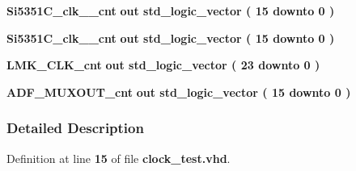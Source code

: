 \begin{DoxyCompactItemize}
\item 
{\bf Si5351\+C\+\_\+clk\+\_\+\_\+cnt}  {\bfseries {\bfseries \textcolor{keywordflow}{out}\textcolor{vhdlchar}{ }}} {\bfseries \textcolor{comment}{std\+\_\+logic\+\_\+vector}\textcolor{vhdlchar}{ }\textcolor{vhdlchar}{(}\textcolor{vhdlchar}{ }\textcolor{vhdlchar}{ } \textcolor{vhdldigit}{15} \textcolor{vhdlchar}{ }\textcolor{keywordflow}{downto}\textcolor{vhdlchar}{ }\textcolor{vhdlchar}{ } \textcolor{vhdldigit}{0} \textcolor{vhdlchar}{ }\textcolor{vhdlchar}{)}\textcolor{vhdlchar}{ }} 
\item 
{\bf Si5351\+C\+\_\+clk\+\_\+\_\+cnt}  {\bfseries {\bfseries \textcolor{keywordflow}{out}\textcolor{vhdlchar}{ }}} {\bfseries \textcolor{comment}{std\+\_\+logic\+\_\+vector}\textcolor{vhdlchar}{ }\textcolor{vhdlchar}{(}\textcolor{vhdlchar}{ }\textcolor{vhdlchar}{ } \textcolor{vhdldigit}{15} \textcolor{vhdlchar}{ }\textcolor{keywordflow}{downto}\textcolor{vhdlchar}{ }\textcolor{vhdlchar}{ } \textcolor{vhdldigit}{0} \textcolor{vhdlchar}{ }\textcolor{vhdlchar}{)}\textcolor{vhdlchar}{ }} 
\item 
{\bf L\+M\+K\+\_\+\+C\+L\+K\+\_\+cnt}  {\bfseries {\bfseries \textcolor{keywordflow}{out}\textcolor{vhdlchar}{ }}} {\bfseries \textcolor{comment}{std\+\_\+logic\+\_\+vector}\textcolor{vhdlchar}{ }\textcolor{vhdlchar}{(}\textcolor{vhdlchar}{ }\textcolor{vhdlchar}{ } \textcolor{vhdldigit}{23} \textcolor{vhdlchar}{ }\textcolor{keywordflow}{downto}\textcolor{vhdlchar}{ }\textcolor{vhdlchar}{ } \textcolor{vhdldigit}{0} \textcolor{vhdlchar}{ }\textcolor{vhdlchar}{)}\textcolor{vhdlchar}{ }} 
\item 
{\bf A\+D\+F\+\_\+\+M\+U\+X\+O\+U\+T\+\_\+cnt}  {\bfseries {\bfseries \textcolor{keywordflow}{out}\textcolor{vhdlchar}{ }}} {\bfseries \textcolor{comment}{std\+\_\+logic\+\_\+vector}\textcolor{vhdlchar}{ }\textcolor{vhdlchar}{(}\textcolor{vhdlchar}{ }\textcolor{vhdlchar}{ } \textcolor{vhdldigit}{15} \textcolor{vhdlchar}{ }\textcolor{keywordflow}{downto}\textcolor{vhdlchar}{ }\textcolor{vhdlchar}{ } \textcolor{vhdldigit}{0} \textcolor{vhdlchar}{ }\textcolor{vhdlchar}{)}\textcolor{vhdlchar}{ }} 
\end{DoxyCompactItemize}


\subsubsection{Detailed Description}


Definition at line {\bf 15} of file {\bf clock\+\_\+test.\+vhd}.



